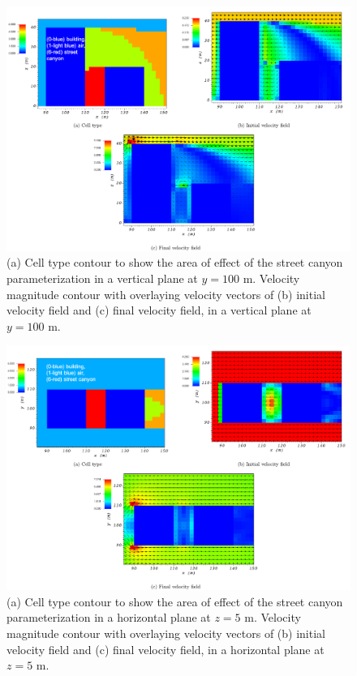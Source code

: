 \begin{figure}[H]
    \centering
    \includegraphics[width=\textwidth]{Images/street_y_100_1.pdf}
    \caption{(a) Cell type contour to show the area of effect of the street canyon parameterization in a vertical plane at $y=100$ m. Velocity magnitude contour with overlaying velocity vectors of (b) initial velocity field and (c) final velocity field, in a vertical plane at $y=100$ m.}
\end{figure}

\begin{figure}[H]
    \centering
    \includegraphics[width=\textwidth]{Images/street_z_5_1.pdf}
    \caption{(a) Cell type contour to show the area of effect of the street canyon parameterization in a horizontal plane at $z=5$ m. Velocity magnitude contour with overlaying velocity vectors of (b) initial velocity field and (c) final velocity field, in a horizontal plane at $z=5$ m.}
\end{figure}

